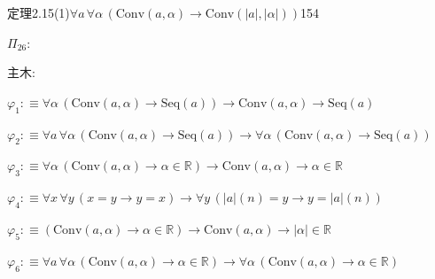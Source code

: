 \begin{fullproof}{定理2.15(1)}{$\forall a\,\forall \alpha\,(\mathrm{Conv}(a,\alpha) \to \mathrm{Conv}(\lvert a \rvert,\lvert \alpha \rvert))$}{154}
\begin{ptree}
\end{ptree}
\noindent$\Pi_{26}$:
\begin{ptree}
\noLine
{}
\noLine
{}
\end{ptree}
\noindent 主木:
\begin{ptree}
\noLine
{}
\noLine
{}
\end{ptree}
\begin{abbrevlist}
\item $\varphi_{1} :\equiv \forall \alpha\,(\mathrm{Conv}(a,\alpha) \to \mathrm{Seq}(a)) \to \mathrm{Conv}(a,\alpha) \to \mathrm{Seq}(a)$
\item $\varphi_{2} :\equiv \forall a\,\forall \alpha\,(\mathrm{Conv}(a,\alpha) \to \mathrm{Seq}(a)) \to \forall \alpha\,(\mathrm{Conv}(a,\alpha) \to \mathrm{Seq}(a))$
\item $\varphi_{3} :\equiv \forall \alpha\,(\mathrm{Conv}(a,\alpha) \to \alpha \in \mathbb{R}) \to \mathrm{Conv}(a,\alpha) \to \alpha \in \mathbb{R}$
\item $\varphi_{4} :\equiv \forall x\,\forall y\,(x = y \to y = x) \to \forall y\,(\lvert a \rvert(n) = y \to y = \lvert a \rvert(n))$
\item $\varphi_{5} :\equiv (\mathrm{Conv}(a,\alpha) \to \alpha \in \mathbb{R}) \to \mathrm{Conv}(a,\alpha) \to \lvert \alpha \rvert \in \mathbb{R}$
\item $\varphi_{6} :\equiv \forall a\,\forall \alpha\,(\mathrm{Conv}(a,\alpha) \to \alpha \in \mathbb{R}) \to \forall \alpha\,(\mathrm{Conv}(a,\alpha) \to \alpha \in \mathbb{R})$

\end{abbrevlist}
\end{fullproof}
